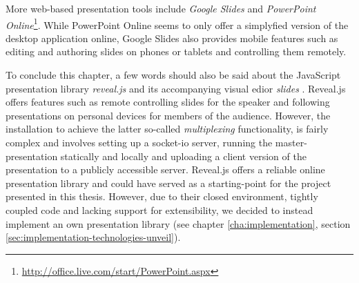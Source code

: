 More web-based presentation tools include \emph{Google Slides} \cite{google-slides} and \emph{PowerPoint Online}\footnote{\url{http://office.live.com/start/PowerPoint.aspx}}. While PowerPoint Online seems to only offer a simplyfied version of the desktop application online, Google Slides also provides mobile features such as editing and authoring slides on phones or tablets and controlling them remotely.

To conclude this chapter, a few words should also be said about the JavaScript presentation library \emph{reveal.js} \cite{revealjs} and its accompanying visual edior \emph{slides} \cite{slides-com}. Reveal.js offers features such as remote controlling slides for the speaker and following presentations on personal devices for members of the audience. However, the installation to achieve the latter so-called \emph{multiplexing} functionality, is fairly complex and involves setting up a socket-io server, running the master-presentation statically and locally and uploading a client version of the presentation to a publicly accessible server. Reveal.js offers a reliable online presentation library and could have served as a starting-point for the project presented in this thesis. However, due to their closed environment, tightly coupled code and lacking support for extensibility, we decided to instead implement an own presentation library (see chapter \ref{cha:implementation}, section \ref{sec:implementation-technologies-unveil}).